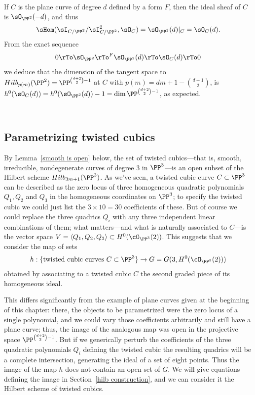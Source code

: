 \begin{example}\label{Hilb for plane curves-continued}
If $C$ is the plane curve of degree $d$ defined by a form $F$, then the ideal sheaf of $C$ is $\sO_{\PP^2}(-d)$, and thus
$$
\sHom(\sI_{C/\PP^2}/\sI_{C/\PP^2}^2, \sO_{C}) = \sO_{\PP^2}(d)|_C = \sO_C(d).
$$
From the exact sequence 
$$
0\rTo\sO_{\PP^2}\rTo^F\sO_{\PP^2}(d) \rTo\sO_C(d)\rTo 0
$$
we deduce that the dimension of the tangent space to $Hilb_{p(m)}(\PP^2)=\PP^{\binom{d+2}{2}-1}$  at $C$
with $p(m) = dm+1-{d-1\choose 2}$,
is $h^0(\sO_C(d)) = h^0(\sO_{\PP^2}(d))-1 = \dim \PP^{\binom{d+2}{2}-1}$, as expected.
\end{example}

\

\subsection{Parametrizing twisted cubics} By Lemma~\ref{smooth is open} below, the set of twisted cubics---that is, smooth, irreducible, nondegenerate curves of degree 3 in $\PP^3$---is an open subset of the Hilbert scheme $Hilb_{3m+1}(\PP^3)$. As we've seen, a twisted cubic curve $C \subset \PP^3$ can be described as the zero locus of three homogeneous quadratic polynomials $Q_1, Q_2$ and $Q_3$ in the homogeneous coordinates on $\PP^3$; to specify the twisted cubic we could just list the $3 \times 10 = 30$ coefficients of these. But of course we could replace the three quadrics $Q_i$ with any three independent linear combinations of them; what matters---and what is naturally associated to $C$---is the vector space $V = \langle Q_1, Q_2, Q_3 \rangle \subset H^0(\cO_{\PP^3}(2))$. This suggests that we consider the map of sets
$$
h : \{ \text{twisted cubic curves } C \subset \PP^3 \} \to G = G(3, H^0(\cO_{\PP^3}(2)))
$$
obtained by associating to a twisted cubic $C$ the second graded piece of its homogeneous ideal. 

This differs significantly from the example of plane curves given at the beginning of this chapter: there, the objects to be parametrized were the zero locus of a single polynomial, and we could vary those coefficients arbitrarily and still have a plane curve; thus, the image of the analogous map was open in the projective space $\PP^{\binom{d+2}{2}-1}$. But if we generically
perturb the coefficients of the three quadratic polynomials $Q_i$ defining the twisted cubic the resulting quadrics will
be a complete intersection, generating
 the ideal of a set of eight points. Thus the image of the map $h$ does not contain an open set of $G$.
We will give equations defining the image in Section~\ref{hilb construction}, and we can consider it
the Hilbert scheme of twisted cubics.

